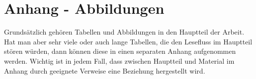 
\clearpage
\chapter{Anhang - Abbildungen}

Grundsätzlich gehören Tabellen und Abbildungen in den Hauptteil der Arbeit. Hat man aber sehr viele oder auch lange Tabellen, die den Lesefluss im Hauptteil stören würden, dann können diese in einen separaten Anhang aufgenommen werden. Wichtig ist in jedem Fall, dass zwischen Hauptteil und Material im Anhang durch geeignete Verweise eine Beziehung hergestellt wird.
